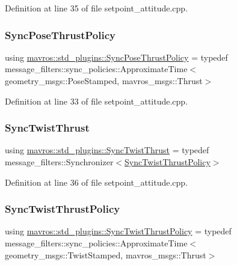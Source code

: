 Definition at line 35 of file setpoint\+\_\+attitude.\+cpp.

\mbox{\label{group__plugin_ga48ed4062810bb42590cbed0b4e0dc237}} 
\subsubsection{\texorpdfstring{SyncPoseThrustPolicy}{SyncPoseThrustPolicy}}
{\footnotesize\ttfamily using \mbox{\hyperlink{group__plugin_ga48ed4062810bb42590cbed0b4e0dc237}{mavros\+::std\+\_\+plugins\+::\+Sync\+Pose\+Thrust\+Policy}} = typedef message\+\_\+filters\+::sync\+\_\+policies\+::\+Approximate\+Time$<$geometry\+\_\+msgs\+::\+Pose\+Stamped, mavros\+\_\+msgs\+::\+Thrust$>$}



Definition at line 33 of file setpoint\+\_\+attitude.\+cpp.

\mbox{\label{group__plugin_ga4a8954a9b71d632e038309fa85fe5bb2}} 
\subsubsection{\texorpdfstring{SyncTwistThrust}{SyncTwistThrust}}
{\footnotesize\ttfamily using \mbox{\hyperlink{group__plugin_ga4a8954a9b71d632e038309fa85fe5bb2}{mavros\+::std\+\_\+plugins\+::\+Sync\+Twist\+Thrust}} = typedef message\+\_\+filters\+::\+Synchronizer$<$\mbox{\hyperlink{group__plugin_gacfaec844da30bf9462d4583c55fa64e1}{Sync\+Twist\+Thrust\+Policy}}$>$}



Definition at line 36 of file setpoint\+\_\+attitude.\+cpp.

\mbox{\label{group__plugin_gacfaec844da30bf9462d4583c55fa64e1}} 
\subsubsection{\texorpdfstring{SyncTwistThrustPolicy}{SyncTwistThrustPolicy}}
{\footnotesize\ttfamily using \mbox{\hyperlink{group__plugin_gacfaec844da30bf9462d4583c55fa64e1}{mavros\+::std\+\_\+plugins\+::\+Sync\+Twist\+Thrust\+Policy}} = typedef message\+\_\+filters\+::sync\+\_\+policies\+::\+Approximate\+Time$<$geometry\+\_\+msgs\+::\+Twist\+Stamped, mavros\+\_\+msgs\+::\+Thrust$>$}



